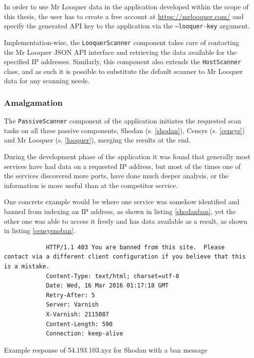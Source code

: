 \documentclass[a4paper,12pt]{article}
\begin{document}
	In order to use Mr Looquer data in the application developed within the scope of this thesis, the user has to create a free account at \url{https://mrlooquer.com/} and specify the generated API key to the application via the \texttt{--looquer-key} argument.
		
	Implementation-wise, the \texttt{LooquerScanner} component takes care of contacting the Mr Looquer JSON API interface and retrieving the data available for the specified IP addresses. Similarly, this component also extends the \texttt{HostScanner} class, and as such it is possible to substitute the default scanner to Mr Looquer data for any scanning needs.

\subsubsection{Amalgamation}
 

	The \texttt{PassiveScanner} component of the application initiates the requested scan tasks on all three passive components, Shodan (s. \ref{shodan}), Censys (s. \ref{censys}) and Mr Looquer (s. \ref{looquer}), merging the results at the end.
	
	During the development phase of the application it was found that generally most services have had data on a requested IP address, but most of the times one of the services discovered more ports, have done much deeper analysis, or the information is more useful than at the competitor service.
	
	One concrete example would be where one service was somehow identified and banned from indexing an IP address, as shown in listing \ref{shodanban}, yet the other one was able to access it freely and has data available as a result, as shown in listing \ref{censysnoban}.
	
	\begin{listing}[H]
		\begin{verbatim}
			HTTP/1.1 403 You are banned from this site.  Please contact via a different client configuration if you believe that this is a mistake.
			Content-Type: text/html; charset=utf-8
			Date: Wed, 16 Mar 2016 01:17:18 GMT
			Retry-After: 5
			Server: Varnish
			X-Varnish: 2115087
			Content-Length: 590
			Connection: keep-alive
		\end{verbatim}
		\caption{Example response of 54.193.103.xyz for Shodan with a ban message}
		\label{shodanban}
	\end{listing}
		
\end{document}
